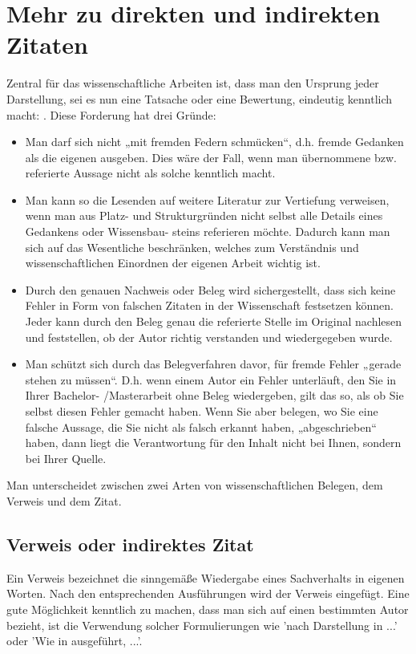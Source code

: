 \section{Mehr zu direkten und indirekten Zitaten}\label{app:zitieren}
Zentral für das wissenschaftliche Arbeiten ist, dass man den Ursprung jeder Darstellung, sei es nun
eine Tatsache oder eine Bewertung, eindeutig kenntlich macht: \cite{shiny1}. Diese
Forderung hat drei Gründe:
\begin{itemize}
\item Man darf sich nicht „mit fremden Federn schmücken“, d.h. fremde Gedanken als die
eigenen ausgeben. Dies wäre der Fall, wenn man übernommene bzw. referierte Aussage
nicht als solche kenntlich macht.
\item  Man kann so die Lesenden auf weitere Literatur zur Vertiefung verweisen, wenn man aus
Platz- und Strukturgründen nicht selbst alle Details eines Gedankens oder Wissensbau-
steins referieren möchte. Dadurch kann man sich auf das Wesentliche beschränken,
welches zum Verständnis und wissenschaftlichen Einordnen der eigenen Arbeit wichtig ist.
\item Durch den genauen Nachweis oder Beleg wird sichergestellt, dass sich keine Fehler in
Form von falschen Zitaten in der Wissenschaft festsetzen können. Jeder kann durch den
Beleg genau die referierte Stelle im Original nachlesen und feststellen, ob der Autor richtig
verstanden und wiedergegeben wurde.
\item Man schützt sich durch das Belegverfahren davor, für fremde Fehler „gerade stehen zu
müssen“. D.h. wenn einem Autor ein Fehler unterläuft, den Sie in Ihrer Bachelor-
/Masterarbeit ohne Beleg wiedergeben, gilt das so, als ob Sie selbst diesen Fehler
gemacht haben. Wenn Sie aber belegen, wo Sie eine falsche Aussage, die Sie nicht als
falsch erkannt haben, „abgeschrieben“ haben, dann liegt die Verantwortung für den Inhalt
nicht bei Ihnen, sondern bei Ihrer Quelle.
\end{itemize}
Man unterscheidet zwischen zwei Arten von wissenschaftlichen Belegen, dem Verweis und dem
Zitat.
\subsection{Verweis oder indirektes Zitat}
Ein Verweis bezeichnet die sinngemäße Wiedergabe eines Sachverhalts in eigenen Worten. Nach
den entsprechenden Ausführungen wird der Verweis \cite{clemen1989combining} eingefügt. 
Eine gute Möglichkeit kenntlich zu machen, dass man sich auf einen bestimmten Autor bezieht, ist
die Verwendung solcher Formulierungen wie 'nach Darstellung in \cite{clemen1989combining} ...' oder 'Wie in \cite{clemen1989combining} ausgeführt, ...'.
